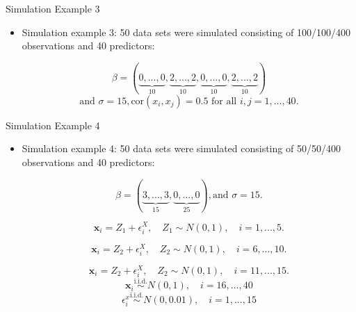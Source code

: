     \begin{frame}{Simulation Example 3}
        \begin{itemize}
            \item Simulation example 3: 50 data sets were simulated consisting of 100/100/400 observations and 40 predictors:
            
 $$\beta= ( \underbrace{0, ...,0}_{10} ,\underbrace{2, ..., 2}_{10}, \underbrace{0, ...,0}_{10} ,\underbrace{2, ..., 2}_{10}) $$ 
 $$ \text{and } \sigma= 15,  \text{cor}( x_i, x_j) = 0.5 \text{ for all }i,j=1,...,40.$$
        \end{itemize}
    \end{frame}


    \begin{frame}{Simulation Example 4}
        \begin{itemize}
            \item Simulation example 4: 50 data sets were simulated consisting of 50/50/400 observations and 40 predictors:

$$\beta= ( \underbrace{3, ..., 3}_{15}, \underbrace{0, ..., 0}_{25}) , \text{and }\sigma=15.$$

$$\mathbf{x}_{i}=Z_1+\epsilon_i^X,\quad Z_1\sim N(0,1),\quad i=1,...,5.$$

$$\mathbf{x}_{i}=Z_2+\epsilon_i^X,\quad Z_2\sim N(0,1),\quad i=6,...,10.$$

$$\mathbf{x}_{i}=Z_2+\epsilon_i^X,\quad Z_2\sim N(0,1),\quad i=11,...,15.$$
 $$\mathbf{x}_{i}\overset{\mathrm{i.i.d.}}{\operatorname*{\sim}}N(0,1),\quad i=16,...,40$$
 $$\epsilon_i^x\stackrel{\mathrm{i.i.d.}}{\sim}N(0,0.01),\quad i=1,...,15$$
            
        \end{itemize}
    \end{frame}

